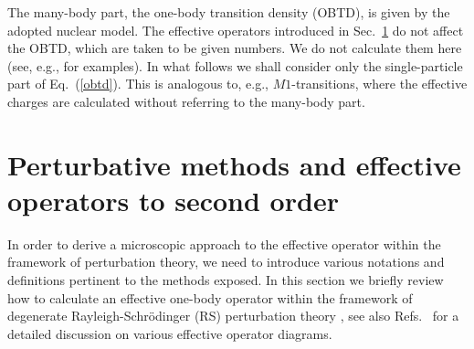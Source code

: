 The many-body part, the one-body transition density (OBTD), is given by
the adopted nuclear model. The effective operators introduced in Sec.\
\ref{Sec:eff} do not affect the OBTD, which are taken to be given
numbers. We do not calculate them here (see, e.g., \cite{sii98} 
for examples). In what follows we shall consider only the single-particle
part of Eq.\ (\ref{obtd}). This is analogous to, e.g., $M1$-transitions, where
the effective charges are calculated without referring to the many-body
part. 

\section{Perturbative methods and effective operators to second order}
\label{Sec:eff}

In order to derive a microscopic approach to the effective operator
within the framework of perturbation theory, we need to introduce various
notations and definitions pertinent to the methods exposed.
In this section we briefly review how to calculate an effective one-body
operator within the framework of degenerate Rayleigh-Schr\"{o}dinger
(RS) perturbation theory \cite{ko90,lm85}, see also Refs.~\cite{tow87,cas90}
for a detailed discussion on various effective operator diagrams.

